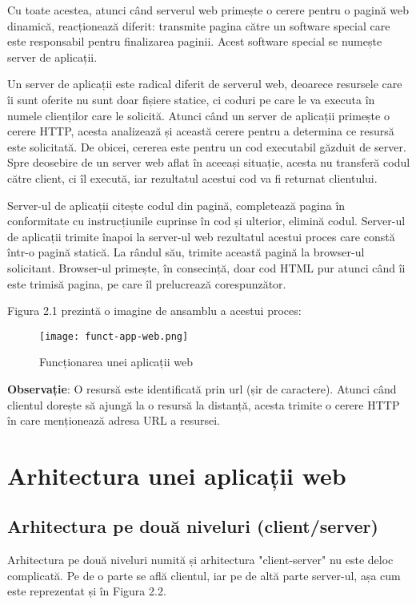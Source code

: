 Cu toate acestea, atunci când serverul web primește o cerere pentru o pagină web dinamică, reacționează diferit: transmite pagina către un software special care este responsabil pentru finalizarea paginii. Acest software special se numește server de aplicații.\newline

Un server de aplicații este radical diferit de serverul web, deoarece resursele care îi sunt oferite nu sunt doar fișiere statice, ci coduri pe care le va executa în numele clienților care le solicită. Atunci când un server de aplicații primește o cerere HTTP, acesta analizează și această cerere pentru a determina ce resursă este solicitată. De obicei, cererea este pentru un cod executabil găzduit de server. Spre deosebire de un server web aflat în aceeași situație, acesta nu transferă codul către client, ci îl execută, iar rezultatul acestui cod va fi returnat clientului.\newline

Server-ul de aplicații citește codul din pagină, completează pagina în conformitate cu instrucțiunile cuprinse în cod și ulterior, elimină codul. Server-ul de aplicații trimite înapoi la server-ul web rezultatul acestui proces care constă într-o pagină statică. La rândul său, trimite această pagină la browser-ul solicitant. Browser-ul primește, în consecință, doar cod HTML pur atunci când îi este trimisă pagina, pe care îl prelucrează corespunzător.\newline

Figura 2.1 prezintă o imagine de ansamblu a acestui proces:\newline

\begin{figure}[H]
	\begin{center}
		\texttt{[image: funct-app-web.png]}
		\caption{Funcționarea unei aplicații web}
	\end{center}
\end{figure}

\textbf{Observație}: O resursă este identificată prin url (șir de caractere). Atunci când clientul dorește să ajungă la o resursă la distanță, acesta trimite o cerere HTTP în care menționează adresa URL a resursei.
\newline

\section{Arhitectura unei aplicații web}
\subsection{Arhitectura pe două niveluri (client/server)}
Arhitectura pe două niveluri numită și arhitectura "client-server" nu este deloc complicată. Pe de o parte se află clientul, iar pe de altă parte server-ul, așa cum este reprezentat și în Figura 2.2.\newline

